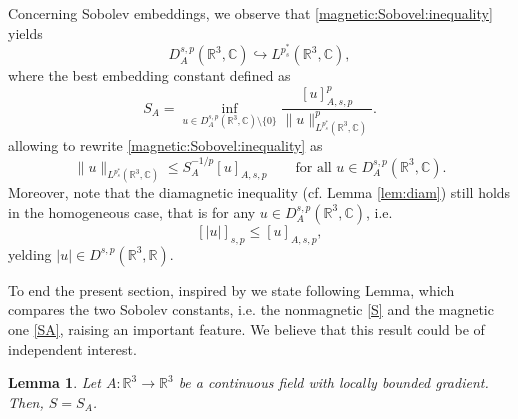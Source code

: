 \documentclass[leqno,11pt]{amsart}
\newcommand{\R}{\mathbb R}
\newcommand{\CC}{\mathbb C}
\newcommand{\C}{\mathbb C}
\numberwithin{equation}{section}
\newtheorem{lemma}[theorem]{Lemma}
\begin{document}
Concerning Sobolev embeddings, we observe that \eqref{magnetic:Sobovel:inequality} yields
\begin{equation}
\label{homogeneous:Sobolev:embedding}
    D^{s,p}_A(\R^3,\C) \hookrightarrow L^{p^*_s}(\R^3,\C),
\end{equation}
where the best embedding constant defined as
\begin{equation}\label{SA}
S_A= \inf_{u\in D^{s,p}_A(\R^3,\CC)\setminus\{0\}} \frac{[u]_{A,s,p}^p}{\|u\|_{L^{p^*_s}(\R^3,\C)}^p}. 
\end{equation}
allowing to rewrite \eqref{magnetic:Sobovel:inequality} as
\begin{equation}\label{magnetic:Sobovel:inequality:Dspa}
    \|u\|_{L^{p^*_s}(\R^3,\C)} \leq S_A^{-1/p}[u]_{A,s,p} \qquad \text{for all}\,\, u\in D^{s,p}_A(\R^3,\C).
\end{equation}
Moreover, note that the diamagnetic inequality (cf. Lemma \ref{lem:diam}) still holds in the homogeneous case, that is for any $u\in D^{s,p}_A(\R^3,\CC)$, i.e.
\begin{equation}\label{diamagnetic:D}
[ |u| ]_{s,p}\le [u]_{A,s,p},
\end{equation}
yelding $|u| \in D^{s,p}(\R^3,\R)$.

To end the present section, inspired by \cite[Lemma 4.6]{dAveniaSquassina} we state following Lemma, which compares the two Sobolev constants, i.e. the nonmagnetic \eqref{S} and the magnetic one \eqref{SA}, raising an important feature. We believe that this result could be of independent interest.
\begin{lemma}
\label{Sobolev:constants:equal}
Let $A:\R^3 \to \R^3$ be a continuous field with locally bounded gradient. Then, $S=S_A$.
\end{lemma}
\end{document}
